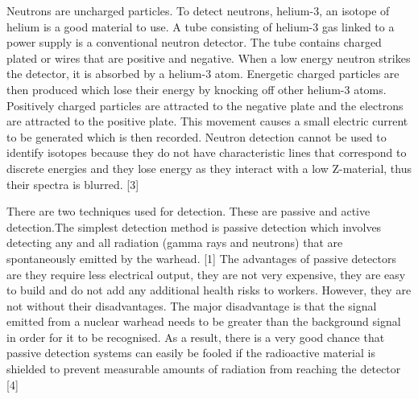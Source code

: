 \documentclass[twocolumn,a4paper]{article}
\begin{document}
Neutrons are uncharged particles. To detect neutrons, helium-3, an
isotope of helium is a good material to use. A tube consisting of
helium-3 gas linked to a power supply is a conventional neutron
detector. The tube contains charged plated or wires that are positive
and negative. When a low energy neutron strikes the detector, it is
absorbed by a helium-3 atom.  Energetic charged particles are then
produced which lose their energy by knocking off other helium-3
atoms. Positively charged particles are attracted to the negative
plate and the electrons are attracted to the positive plate. This
movement causes a small electric current to be generated which is then
recorded. Neutron detection cannot be used to identify isotopes
because they do not have characteristic lines that correspond to
discrete energies and they lose energy as they interact with a low
Z-material, thus their spectra is blurred. [3]

There are two techniques used for detection. These are passive and
active detection.The simplest detection method is passive detection
which involves detecting any and all radiation (gamma rays and
neutrons) that are spontaneously emitted by the warhead. [1] The
advantages of passive detectors are they require less electrical
output, they are not very expensive, they are easy to build and do not
add any additional health risks to workers. However, they are not
without their disadvantages. The major disadvantage is that the signal
emitted from a nuclear warhead needs to be greater than the background
signal in order for it to be recognised. As a result, there is a very
good chance that passive detection systems can easily be fooled if the
radioactive material is shielded to prevent measurable amounts of
radiation from reaching the detector [4]
\end{document}
